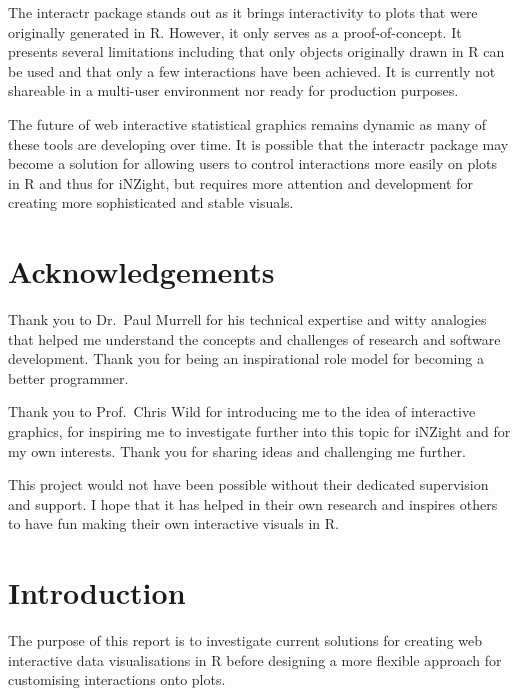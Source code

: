 \documentclass[11pt,]{report}
\begin{document}
The \textsf{interactr} package stands out as it brings interactivity to
plots that were originally generated in R. However, it only serves as a
proof-of-concept. It presents several limitations including that only
objects originally drawn in R can be used and that only a few
interactions have been achieved. It is currently not shareable in a
multi-user environment nor ready for production purposes.

The future of web interactive statistical graphics remains dynamic as
many of these tools are developing over time. It is possible that the
\textsf{interactr} package may become a solution for allowing users to
control interactions more easily on plots in R and thus for
\textsf{iNZight}, but requires more attention and development for
creating more sophisticated and stable visuals.

\chapter*{Acknowledgements}\label{acknowledgements}

Thank you to Dr.~Paul Murrell for his technical expertise and witty
analogies that helped me understand the concepts and challenges of
research and software development. Thank you for being an inspirational
role model for becoming a better programmer.

Thank you to Prof.~Chris Wild for introducing me to the idea of
interactive graphics, for inspiring me to investigate further into this
topic for iNZight and for my own interests. Thank you for sharing ideas
and challenging me further.

This project would not have been possible without their dedicated
supervision and support. I hope that it has helped in their own research
and inspires others to have fun making their own interactive visuals in
R.

\newpage

\tableofcontents
\listoffigures

\newpage

\chapter{Introduction}\label{introduction}

The purpose of this report is to investigate current solutions for
creating web interactive data visualisations in R before designing a
more flexible approach for customising interactions onto plots.
\end{document}
